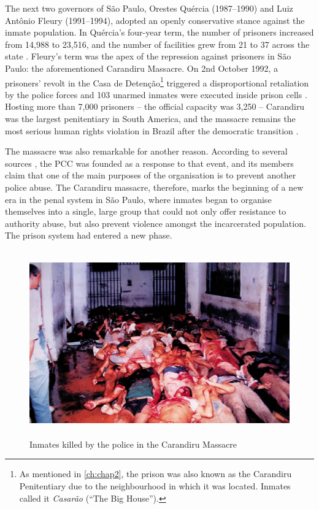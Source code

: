 The next two governors of S\~{a}o Paulo, Orestes Qu\'{e}rcia (1987--1990) and Luiz Ant\^{o}nio Fleury (1991--1994), adopted an openly conservative stance against the inmate population. In Qu\'{e}rcia's four-year term, the number of prisoners increased from 14,988 to 23,516, and the number of facilities grew from 21 to 37 across the state  \citep[77]{salla2007montoro}. Fleury's term was the apex of the repression against prisoners in S\~{a}o Paulo: the aforementioned Carandiru Massacre. On 2nd October 1992, a prisoners' revolt in the Casa de Deten\c{c}\~{a}o\footnote{As mentioned in \autoref{ch:chap2}, the prison was also known as the Carandiru Penitentiary due to the neighbourhood in which it was located. Inmates called it \textit{Casar\~{a}o} (``The Big House'').} triggered a disproportional retaliation by the police forces and 103 unarmed inmates were executed inside prison cells \citep[]{adorno2007organized, pieta1993pavilhao}. Hosting more than 7,000 prisoners -- the official capacity was 3,250 -- Carandiru was the largest penitentiary in South America, and the massacre remains the most serious human rights violation in Brazil after the democratic transition \citep[]{ahnen2003between}.

The massacre was also remarkable for another reason. According to several sources \citep{amorim2003cv, biondi2010junto, dias2011pulverizaccao, jozino2004cobras, souza2007pcc}, the PCC was founded as a response to that event, and its members claim that one of the main purposes of the organisation is to prevent another police abuse. The Carandiru massacre, therefore, marks the beginning of a new era in the penal system in S\~{a}o Paulo, where inmates began to organise themselves into a single, large group that could not only offer resistance to authority abuse, but also prevent violence amongst the incarcerated population. The prison system had entered a new phase.

\begin{center}
\begin{figure}[bth]
\includegraphics[height = 8cm, width = 1\linewidth]{gfx/fig4}
\caption[Inmates killed by the police in the Carandiru Massacre, 1992]{Inmates killed by the police in the Carandiru Massacre\footnotemark}
\label{fig:fig4}
\end{figure}
\end{center}

